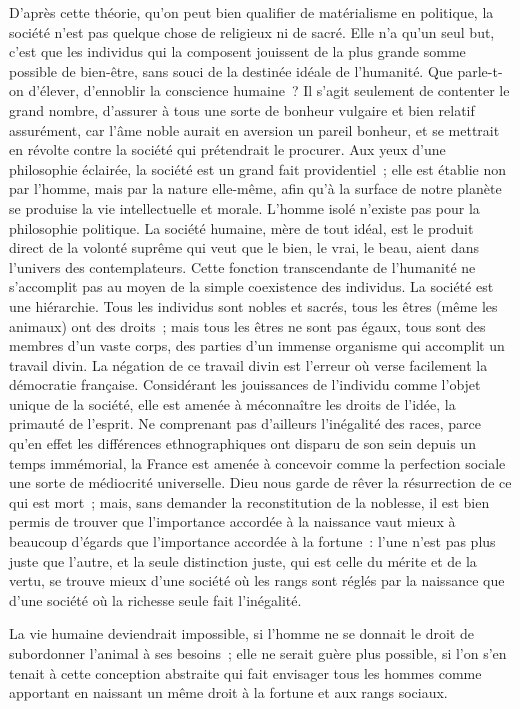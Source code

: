 \documentclass[french,twoside]{book} %
\begin{document}
D’après cette théorie, qu’on peut bien qualifier de matérialisme en politique, la société n’est pas quelque chose de religieux ni de sacré. Elle n’a qu’un seul but, c’est que les individus qui la composent jouissent de la plus grande somme possible de bien-être, sans souci de la destinée idéale de l’humanité. Que parle-t-on d’élever, d’ennoblir la conscience humaine ? Il s’agit seulement de contenter le grand nombre, d’assurer à tous une sorte de bonheur vulgaire et bien relatif assurément, car l’âme noble aurait en aversion un pareil bonheur, et se mettrait en révolte contre la société qui prétendrait le procurer. Aux yeux d’une philosophie éclairée, la société est un grand fait providentiel ; elle est établie non par l’homme, mais par la nature elle-même, afin qu’à la surface de notre planète se produise la vie intellectuelle et morale. L’homme isolé n’existe pas pour la philosophie politique. La société humaine, mère de tout idéal, est le produit direct de la volonté suprême qui veut que le bien, le vrai, le beau, aient dans l’univers des contemplateurs. Cette fonction transcendante de l’humanité ne s’accomplit pas au moyen de la simple coexistence des individus. La société est une hiérarchie. Tous les individus sont nobles et sacrés, tous les êtres (même les animaux) ont des droits ; mais tous les êtres ne sont pas égaux, tous sont des membres d’un vaste corps, des parties d’un immense organisme qui accomplit un travail divin. La négation de ce travail divin est l’erreur où verse facilement la démocratie française. Considérant les jouissances de l’individu comme l’objet unique de la société, elle est amenée à méconnaître les droits de l’idée, la primauté de l’esprit. Ne comprenant pas d’ailleurs l’inégalité des races, parce qu’en effet les différences ethnographiques ont disparu de son sein depuis un temps immémorial, la France est amenée à concevoir comme la perfection sociale une sorte de médiocrité universelle. Dieu nous garde de rêver la résurrection de ce qui est mort ; mais, sans demander la reconstitution de la noblesse, il est bien permis de trouver que l’importance accordée à la naissance vaut mieux à beaucoup d’égards que l’importance accordée à la fortune : l’une n’est pas plus juste que l’autre, et la seule distinction juste, qui est celle du mérite et de la vertu, se trouve mieux d’une société où les rangs sont réglés par la naissance que d’une société où la richesse seule fait l’inégalité.\par
La vie humaine deviendrait impossible, si l’homme ne se donnait le droit de subordonner l’animal à ses besoins ; elle ne serait guère plus possible, si l’on s’en tenait à cette conception abstraite qui fait envisager tous les hommes comme apportant en naissant un même droit à la fortune et aux rangs sociaux.\par
\end{document}
